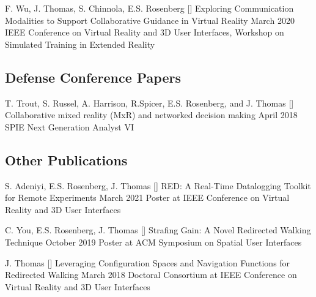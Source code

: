 \begin{cventries}
  \cventry
    {F. Wu, J. Thomas, S. Chinnola, E.S. Rosenberg} %
    {[\thenpubs] Exploring Communication Modalities to Support Collaborative Guidance in Virtual Reality} %
    {March 2020} %
    {} %
    {IEEE Conference on Virtual Reality and 3D User Interfaces, Workshop on Simulated Training in Extended Reality} %
    
  \vspace{-.25cm}
  \subsection*{Defense Conference Papers}
  \cventry
    {T. Trout, S. Russel, A. Harrison, R.Spicer, E.S. Rosenberg, and J. Thomas} %
    {[\thenpubs] Collaborative mixed reality (MxR) and networked decision making} %
    {April 2018} %
    {} %
    {SPIE Next Generation Analyst VI} %
    
  \vspace{-.25cm}    
  \subsection*{Other Publications}
    
  \cventry
    {S. Adeniyi, E.S. Rosenberg, J. Thomas} %
    {[\thenpubs] RED: A Real-Time Datalogging Toolkit for Remote Experiments} %
    {March 2021} %
    {} %
    {Poster at IEEE Conference on Virtual Reality and 3D User Interfaces} %
    
  \cventry
    {C. You, E.S. Rosenberg, J. Thomas} %
    {[\thenpubs] Strafing Gain: A Novel Redirected Walking Technique} %
    {October 2019} %
    {} %
    {Poster at ACM Symposium on Spatial User Interfaces} %
  
  \cventry
    {J. Thomas} %
    {[\thenpubs] Leveraging Configuration Spaces and Navigation Functions for Redirected Walking} %
    {March 2018} %
    {} %
    {Doctoral Consortium at IEEE Conference on Virtual Reality and 3D User Interfaces} %
    

\end{cventries}
